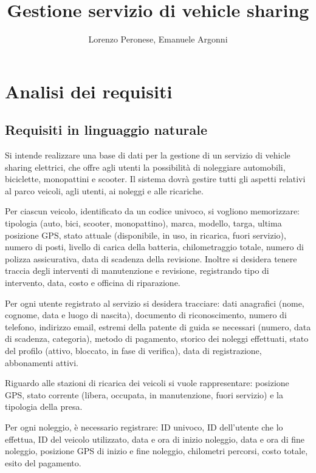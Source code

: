\documentclass{article}
\title{Gestione servizio di vehicle sharing}
\author{Lorenzo Peronese, Emanuele Argonni}
\begin{document}
\maketitle

\tableofcontents

\newpage

\section{Analisi dei requisiti}

\subsection{Requisiti in linguaggio naturale}

Si intende realizzare una base di dati per la gestione di un servizio di vehicle sharing elettrici, che offre agli utenti la possibilità di noleggiare automobili, biciclette, monopattini e scooter.
Il sistema dovrà gestire tutti gli aspetti relativi al parco veicoli, agli utenti, ai noleggi e alle ricariche.

Per ciascun veicolo, identificato da un codice univoco, si vogliono memorizzare: tipologia (auto, bici, scooter, monopattino), marca, modello, targa, ultima posizione GPS, stato attuale (disponibile, in uso, in ricarica, fuori servizio), numero di posti, livello di carica della batteria, chilometraggio totale, numero di polizza assicurativa, data di scadenza della revisione. Inoltre si desidera tenere traccia degli interventi di manutenzione e revisione, registrando tipo di intervento, data, costo e officina di riparazione.

Per ogni utente registrato al servizio si desidera tracciare: dati anagrafici (nome, cognome, data e luogo di nascita), documento di riconoscimento, numero di telefono, indirizzo email, estremi della patente di guida se necessari (numero, data di scadenza, categoria), metodo di pagamento, storico dei noleggi effettuati, stato del profilo (attivo, bloccato, in fase di verifica), data di registrazione, abbonamenti attivi.

Riguardo alle stazioni di ricarica dei veicoli si vuole rappresentare: posizione GPS, stato corrente (libera, occupata, in manutenzione, fuori servizio) e la tipologia della presa.

Per ogni noleggio, è necessario registrare: ID univoco, ID dell’utente che lo effettua, ID del veicolo utilizzato, data e ora di inizio noleggio, data e ora di fine noleggio, posizione GPS di inizio e fine noleggio, chilometri percorsi, costo totale, esito del pagamento.
\end{document}
